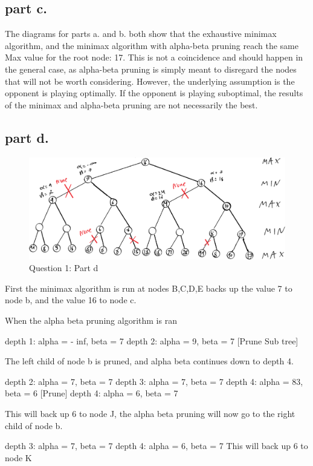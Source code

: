 \subsection{part c.}
The diagrams for parts a. and b. both show that the exhaustive minimax algorithm,
and the minimax algorithm with alpha-beta pruning reach the same Max value for the
root node: 17. This is not a coincidence and should happen in the general case, as
alpha-beta pruning is simply meant to disregard the nodes that will not be worth considering. However,
the underlying assumption is the opponent is playing optimally. If the opponent is playing suboptimal, the results of
the minimax and alpha-beta pruning are not necessarily the best.

\subsection{part d.}

\begin{figure}[H]
	\centering
  \includegraphics[scale = 0.65]{q1_part_d.png}
	\caption{Question 1: Part d}
	\label{fig: Q1 Part d}
\end{figure}

First the minimax algorithm is run at nodes B,C,D,E backs up the value 7 to node b, and the value 16 to node c.

When the alpha beta pruning algorithm is ran

depth 1: alpha = - inf, beta = 7
depth 2: alpha = 9, beta = 7 [Prune Sub tree]

The left child of node b is pruned, and alpha beta continues down to depth 4.

depth 2: alpha = 7, beta = 7
depth 3: alpha = 7, beta = 7
depth 4: alpha = 83, beta = 6 [Prune]
depth 4: alpha = 6, beta = 7

This will back up 6 to node J, the alpha beta pruning will now go to the right child of
node b.

depth 3: alpha = 7, beta = 7
depth 4: alpha = 6, beta = 7
This will back up 6 to node K

